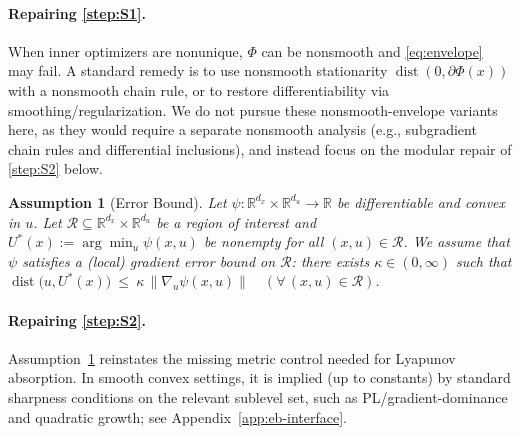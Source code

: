 \documentclass{article}
\newtheorem{assumption}[theorem]{Assumption}
\newcommand{\1}{\mathbf{1}}
\begin{document}


\paragraph{Repairing \ref{step:S1}.}
When inner optimizers are nonunique, $\Phi$ can be nonsmooth and \eqref{eq:envelope} may fail.
A standard remedy is to use nonsmooth stationarity
$\operatorname{dist}(0,\partial\Phi(x))$ with a nonsmooth chain rule, or to restore differentiability via smoothing/regularization.
We do not pursue these nonsmooth-envelope variants here, as they would require a separate nonsmooth analysis
(e.g., subgradient chain rules and differential inclusions), and instead focus on the modular repair of \ref{step:S2} below.



\begin{assumption}[Error Bound]\label{assump:inner-EB}
Let $\psi:\mathbb R^{d_x}\times\mathbb R^{d_u}\to\mathbb R$ be differentiable and convex in $u$.
Let $\mathcal R\subseteq\mathbb R^{d_x}\times\mathbb R^{d_u}$ be a region of interest and
$U^*(x):=\arg\min_u \psi(x,u)$ be nonempty for all $(x,u)\in\mathcal R$.
We assume that $\psi$ satisfies a (local) gradient error bound on $\mathcal R$: there exists $\kappa\in(0,\infty)$ such that
$\operatorname{dist}\bigl(u,U^*(x)\bigr)\ \le\ \kappa\,\|\nabla_u \psi(x,u)\|
\quad(\forall\, (x,u)\in\mathcal R)$.
\end{assumption}
\paragraph{Repairing \ref{step:S2}.} Assumption~\ref{assump:inner-EB} reinstates the missing metric control needed for Lyapunov absorption.
In smooth convex settings, it is implied (up to constants) by standard sharpness conditions on the relevant sublevel set,
such as PL/gradient-dominance and quadratic growth; see Appendix~\ref{app:eb-interface}.
\end{document}

